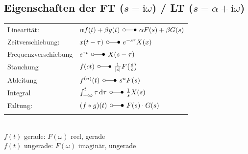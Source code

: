 \documentclass[german]{latex4ei/latex4ei_sheet}
\renewcommand{\i}{\ensuremath{\boldsymbol{\mathrm{i}}}}
\begin{document}
\begin{sectionbox}
	\subsection{Eigenschaften der FT ($s = \i \omega$) / LT ($s = \alpha + \i \omega$)}
	\begin{tabular*}{\columnwidth}{@{\extracolsep\fill}ll@{}}
	Linearität: & $\alpha f(t) + \beta g(t) \ftsymbol \alpha F(s) + \beta G(s)$\\
	Zeitverschiebung: & $x(t - \tau) \ftsymbol e^{-s \tau} X(x)$\\
	Frequenzverschiebung & $e^{\tau t} \ftsymbol X(s - \tau)$\\
	Stauchung & $f(ct) \ftsymbol \frac{1}{\abs{c}} F\bigl(\frac{s}{c}\bigr)$\\
	Ableitung & $f^{(n)}(t) \ftsymbol s^n F(s)$\\
	Integral & $\int_{-\infty}^t \tau \diff \tau \ftsymbol \frac{1}{s} X(s)$\\
	Faltung: & $(f * g)(t) \ftsymbol F(s) \cdot G(s)$\\
	 & 
	\end{tabular*}\\
	$f(t)$ gerade: $F(\omega)$ reel, gerade\\
	$f(t)$ ungerade: $F(\omega)$ imaginär, ungerade

\end{sectionbox}


\end{document}
